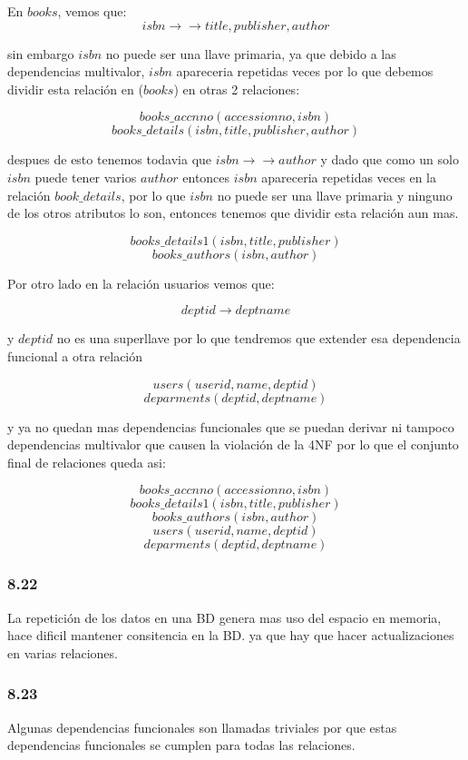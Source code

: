 \documentclass[twoside]{article}
\begin{document}
En $books$, vemos que:
$$isbn \rightarrow \rightarrow title, publisher, author$$

sin embargo $isbn$ no puede ser una llave primaria, ya que debido a las dependencias multivalor,
$isbn$ apareceria repetidas veces por lo que debemos dividir esta relaci\'on en ($books$) en
otras 2 relaciones:

$$books\_accnno(accessionno, isbn)$$
$$books\_details(isbn, title, publisher, author)$$

despues de esto tenemos todavia que $isbn \rightarrow \rightarrow author$ y dado que como un solo $isbn$
puede tener varios $author$ entonces $isbn$ apareceria repetidas veces en la relaci\'on $book\_details$,
por lo que $isbn$ no puede ser una llave primaria y ninguno de los otros atributos lo son, entonces tenemos
que dividir esta relaci\'on aun mas.

$$books\_details1(isbn, title, publisher)$$
$$books\_authors(isbn, author)$$

Por otro lado en la relaci\'on usuarios vemos que:

$$deptid \rightarrow deptname$$

y $deptid$ no es una superllave por lo que tendremos que extender esa dependencia funcional a otra relaci\'on

$$users(userid, name, deptid)$$
$$deparments(deptid, deptname)$$

y ya no quedan mas dependencias funcionales que se puedan derivar ni tampoco dependencias multivalor que causen
la violación de la 4NF por lo que el conjunto final de relaciones queda asi:

$$books\_accnno(accessionno, isbn)$$
$$books\_details1(isbn, title, publisher)$$
$$books\_authors(isbn, author)$$
$$users(userid, name, deptid)$$
$$deparments(deptid, deptname)$$


\subsubsection*{8.22}
La repetici\'on de los datos en una BD genera mas uso del espacio en memoria, hace dificil mantener consitencia en la BD.
ya que hay que hacer actualizaciones en varias relaciones.
\subsubsection*{8.23}
Algunas dependencias funcionales son llamadas triviales por que estas dependencias funcionales se cumplen para todas las relaciones.
\end{document}
